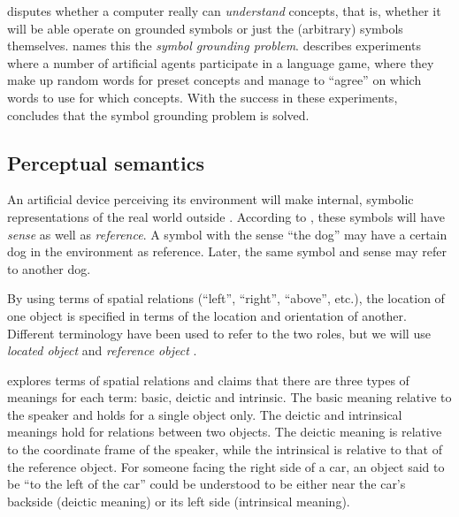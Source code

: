 \cite{SearleMindsbrainsprograms1980} disputes whether a computer really can \textit{understand} concepts, that is, whether it will be able operate on grounded symbols or just the (arbitrary) symbols themselves.
\cite{HarnadSymbolGroundingProblem1990} names this the \textit{symbol grounding problem}.
\cite{SteelsSymbolGroundingProblem2007} describes experiments where a number of artificial agents participate in a language game, where they make up random words for preset concepts and manage to ``agree'' on which words to use for which concepts.
With the success in these experiments, \citeauthor{SteelsSymbolGroundingProblem2007} concludes that the symbol grounding problem is solved.



\subsection{Perceptual semantics}

An artificial device perceiving its environment will make internal, symbolic representations of the real world outside \citep{PustejovskyPerceptualsemanticsconstruction1990}.
According to \cite{FregeUberSinnUnd1892}, these symbols will have \textit{sense} as well as \textit{reference}.
A symbol with the sense ``the dog'' may have a certain dog in the environment as reference.
Later, the same symbol and sense may refer to another dog.

By using terms of spatial relations (``left'', ``right'', ``above'', etc.), the location of one object is specified in terms of the location and orientation of another.
Different terminology have been used to refer to the two roles, but we will use \textit{located object} and \textit{reference object} \citep{DobnikModellinglanguageaction2012}.

\cite{Garnhamunifiedtheorymeaning1989} explores terms of spatial relations and claims that there are three types of meanings for each term: basic, deictic and intrinsic.
The basic meaning relative to the speaker and holds for a single object only.
The deictic and intrinsical meanings hold for relations between two objects.
The deictic meaning is relative to the coordinate frame of the speaker, while the intrinsical is relative to that of the reference object.
For someone facing the right side of a car, an object said to be ``to the left of the car'' could be understood to be either near the car's backside (deictic meaning) or its left side (intrinsical meaning).

